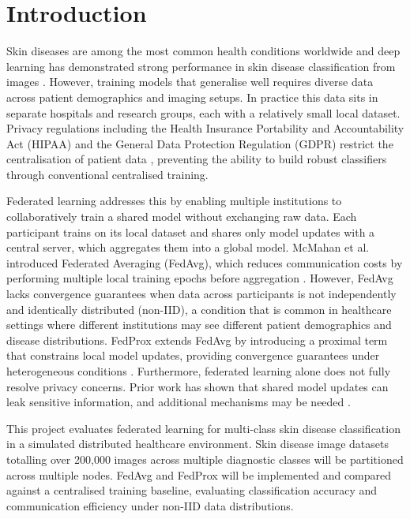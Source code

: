 \documentclass[12pt,openany,a4paper]{book}
\begin{document}
\chapter{Introduction}
  Skin diseases are among the most common health conditions worldwide \cite{hayGlobalBurdenSkin2014} and deep learning has demonstrated strong performance in skin disease classification from images \cite{estevaDermatologistlevelClassificationSkin2017}. However, training models that generalise well requires diverse data across patient demographics and imaging setups. In practice this data sits in separate hospitals and research groups, each with a relatively small local dataset. Privacy regulations including the Health Insurance Portability and Accountability Act (HIPAA) and the General Data Protection Regulation (GDPR) restrict the centralisation of patient data \cite{kaissisSecurePrivacypreservingFederated2020}, preventing the ability to build robust classifiers through conventional centralised training.

  Federated learning addresses this by enabling multiple institutions to collaboratively train a shared model without exchanging raw data. Each participant trains on its local dataset and shares only model updates with a central server, which aggregates them into a global model. McMahan et al. introduced Federated Averaging (FedAvg), which reduces communication costs by performing multiple local training epochs before aggregation \cite{mcmahanCommunicationEfficientLearningDeep2023}. However, FedAvg lacks convergence guarantees when data across participants is not independently and identically distributed (non-IID), a condition that is common in healthcare settings where different institutions may see different patient demographics and disease distributions. FedProx extends FedAvg by introducing a proximal term that constrains local model updates, providing convergence guarantees under heterogeneous conditions \cite{liFederatedOptimizationHeterogeneous2020}. Furthermore, federated learning alone does not fully resolve privacy concerns. Prior work has shown that shared model updates can leak sensitive information, and additional mechanisms may be needed \cite{kaissisSecurePrivacypreservingFederated2020}.

  This project evaluates federated learning for multi-class skin disease classification in a simulated distributed healthcare environment. Skin disease image datasets totalling over 200,000 images across multiple diagnostic classes will be partitioned across multiple nodes. FedAvg and FedProx will be implemented and compared against a centralised training baseline, evaluating classification accuracy and communication efficiency under non-IID data distributions.
\end{document}

